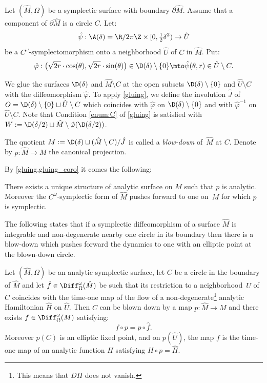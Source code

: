 Let $(\hat M,\Omega)$ be a symplectic surface with boundary $\partial \hat M$. Assume that a component of $\partial \hat M$ is a circle $C$. Let:
\[\hat \psi: \A(\delta)=\R/2\pi \Z \times [0, \tfrac12 \delta^2)\to \hat U\]
be a $C^\omega$-symplectomorphism onto a neighborhood $\hat U$ of $C$ in $\hat M$. Put:
\begin{equation} \label{eq hat phi} \hat \varphi:\bigl(\sqrt{2r } \cdot \cos (\theta), \sqrt{2r }\cdot \sin (\theta)\bigr)\in \D(\delta)\setminus \{0\} \mto \hat \psi(\theta,r)\in \hat U\setminus C.\end{equation}

We glue the surfaces
$ \D(\delta)$ and
$ \hat M\setminus C$ at the open subsets $ \D(\delta)\setminus \{0\}$ and $ \hat U\setminus C$ with the diffeomorphism $\hat \varphi$. To apply \cref{gluing}, we define the involution $\hat J$ of $O=\D(\delta)\setminus \{0\}\sqcup
\hat U\setminus C$ which coincides with $\hat \varphi$ on $\D(\delta)\setminus \{0\}$ and with $\hat \varphi^{-1}$ on $\hat U\setminus C$. Note that Condition \eqref{enum:C} of \cref{gluing} is satisfied with $W:= \D(\delta /2) \sqcup \hat M \setminus \hat \varphi (\D(\delta /2))$.
\begin{definition} The quotient $ M:= \D(\delta)\sqcup (\hat M\setminus C)/\hat J$ is called a \emph{blow-down} of~$\hat M$ at $C$. Denote by $p: \hat M\to M$ the canonical projection. \end{definition}
By \cref{gluing,gluing_coro} it comes the following:
\begin{proposition}\label{prop blow-down} There exists a unique structure of analytic surface on $M$ such that $p$ is analytic. Moreover the $C^\omega$-symplectic form of $\hat M$ pushes forward to one on~$M$ for which $p$ is symplectic.
\end{proposition}
The following states that if a symplectic diffeomorphism of a surface $\hat M$ is integrable and non-degenerate nearby one circle in its boundary then there is a blow-down which pushes forward the dynamics to one with an elliptic point at the blown-down circle.
\begin{theorem}\label{thm blow-down}
Let $(\hat M,\Omega)$ be an analytic symplectic surface, let $C$ be a circle in the boundary of $\hat M$ and let $\hat f\in \Diff^\omega_\Omega(\hat M)$ be such that its restriction to a neighborhood~$\hat U$ of $C$ coincides with the time-one map of the flow of a non-degenerate\footnote{This means that $DH$ does not vanish.} analytic Hamiltonian $\widehat H$ on $\hat U$. Then $C$ can be blown down by a map $p: \hat M\to M$ and there exists $ f\in
\Diff^\omega_\Omega(M)$ satisfying:
\[f\circ p = p \circ \hat f.\]
Moreover $p(C)$ is an elliptic fixed point, and
on $p(\hat U)$, the map $f$ is the time-one map of an analytic function $H$ satisfying $H\circ p= \widehat H$.
\end{theorem}
